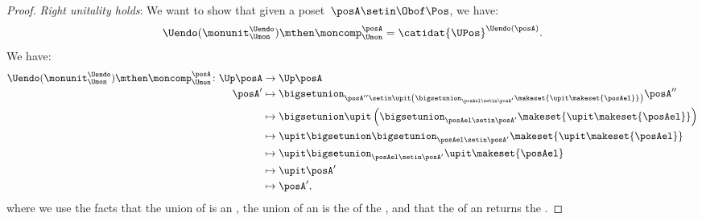 \begin{proof}
    \emph{Right unitality holds}: We want to show that given a poset~$\posA\setin \Obof\Pos$, we have:
    \begin{equation}
        \Uendo(\monunit_{\Umon}^{\Uendo})\mthen \moncomp_{\Umon}^{\posA}=\catidat{\UPos}^{\Uendo(\posA)}.
    \end{equation}
    We have:
    \begin{equation}
        \begin{aligned}
            \Uendo(\monunit_{\Umon}^{\Uendo})\mthen \moncomp_{\Umon}^{\posA}\colon \Up \posA & \to \Up \posA \\
            \posA'                                                                           & \mapsto \bigsetunion_{\posA''\setin \upit \left( \bigsetunion_{\posAel \setin \posA'}\makeset{ \upit \makeset{\posAel}}\right)}\posA'' \\
                                                                                             & \mapsto \bigsetunion \upit \left( \bigsetunion_{\posAel \setin \posA'}\makeset{\upit \makeset{ \posAel} }\right) \\
                                                                                             & \mapsto \upit \bigsetunion   \bigsetunion_{\posAel \setin \posA'}\makeset{\upit \makeset{ \posAel} } \\
                                                                                             & \mapsto \upit \bigsetunion_{\posAel \setin \posA'}\upit \makeset{ \posAel} \\
                                                                                             & \mapsto \upit \posA' \\
                                                                                             & \mapsto \posA',
        \end{aligned}
    \end{equation}
    where we use the facts that the union of  is an , the union of an  is the  of the , and that the  of an  returns the .


\end{proof}
